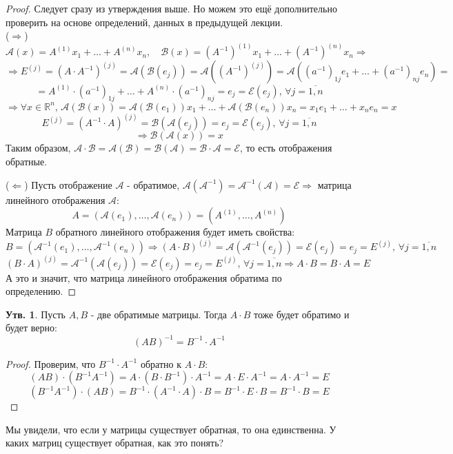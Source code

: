 \documentclass[12pt]{article}
\newcommand{\MR}{\mathbb{R}}
\newcommand{\MA}{\mathcal{A}}
\newcommand{\MCB}{\mathcal{B}}
\newcommand{\MCE}{\mathcal{E}}
\theoremstyle{definition}
\newtheorem{prop}{Утв.}
\begin{document}
\begin{proof}
	Следует сразу из утверждения выше. Но можем это ещё дополнительно проверить на основе определений, данных в предыдущей лекции. \hfill\\
	($\Rightarrow$) 
	$$
		\MA(x) = A^{(1)}x_1 + \dotsc + A^{(n)}x_n, \quad \MCB(x) = (A^{-1})^{(1)}x_1 + \dotsc + (A^{-1})^{(n)}x_n \Rightarrow
	$$
	$$
		\Rightarrow E^{(j)} = (A{\cdot}A^{-1})^{(j)} = \MA(\MCB(e_j)) = \MA\left((A^{-1})^{(j)}\right) = \MA((a^{-1})_{1j}e_1 + \dotsc + (a^{-1})_{nj}e_n) = 
	$$
	$$
		=	A^{(1)}{\cdot}(a^{-1})_{1j} + \dotsc + A^{(n)}{\cdot}(a^{-1})_{nj} =  e_j = \MCE(e_j), \, \forall j = \overline{1,n} 
	$$
	$$
		\Rightarrow \forall x \in \MR^n, \,  \MA(\MCB(x)) = \MA(\MCB(e_1))x_1 + \dotsc + \MA(\MCB(e_n))x_n = x_1e_1 + \dotsc + x_n e_n = x
	$$
	$$
		E^{(j)} = (A^{-1}{\cdot}A)^{(j)} = \MCB(\MA(e_j)) = e_j = \MCE(e_j) , \, \forall j = \overline{1,n}
	$$
	$$ 
		\Rightarrow \MCB(\MA(x)) = x
	$$
	Таким образом, $\MA{\cdot}\MCB = \MA(\MCB) = \MCB(\MA) = \MCB{\cdot}\MA = \MCE$, то есть отображения обратные.
	
	($\Leftarrow$) Пусть отображение $\MA$ - обратимое, $\MA(\MA^{-1}) = \MA^{-1}(\MA) = \MCE \Rightarrow$  матрица линейного отображения $\MA$:
	$$
		A = (\MA(e_1), \dotsc, \MA(e_n)) = \left(A^{(1)}, \dotsc, A^{(n)}\right)
	$$
	Матрица $B$ обратного линейного отображения будет иметь свойства:
	$$
		B = \left(\MA^{-1}(e_1), \dotsc, \MA^{-1}(e_n)\right) \Rightarrow (A{\cdot}B)^{(j)} = \MA(\MA^{-1}(e_j)) = \MCE(e_j) = e_j = E^{(j)}, \, \forall j = \overline{1,n} 
	$$
	$$
		(B{\cdot}A)^{(j)} = \MA^{-1}(\MA(e_j)) = \MCE(e_j) = e_j = E^{(j)}, \, \forall j = \overline{1,n} \Rightarrow A{\cdot}B = B{\cdot}A = E
	$$
	А это и значит, что матрица линейного отображения обратима по определению.
\end{proof}
\begin{prop}
	Пусть $A,B$ - две обратимые матрицы. Тогда $A{\cdot}B$ тоже будет обратимо и будет верно:
	$$
		(AB)^{-1} = B^{-1}{\cdot}A^{-1}
	$$
\end{prop}
\begin{proof}
	Проверим, что $B^{-1}{\cdot}A^{-1}$ обратно к $A{\cdot}B$:
	$$
		(AB){\cdot}(B^{-1}A^{-1})= A{\cdot}(B{\cdot}B^{-1}){\cdot}A^{-1} = A{\cdot}E{\cdot}A^{-1} = A{\cdot}A^{-1} = E
	$$
	$$
		(B^{-1}A^{-1}){\cdot}(AB)= B^{-1}{\cdot}(A^{-1}{\cdot}A){\cdot}B = B^{-1}{\cdot}E{\cdot}B = B^{-1}{\cdot}B = E
	$$
\end{proof}

Мы увидели, что если у матрицы существует обратная, то она единственна. У каких матриц существует обратная, как это понять?
\end{document}
